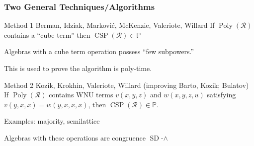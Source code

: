 \documentclass[10pt,xcolor=dvipsnames%
   ]{beamer}
\DeclareMathOperator{\SD}{SD}
\DeclareMathOperator{\CSP}{CSP}
\DeclareMathOperator{\Poly}{Poly}
\renewcommand{\.}{\cdot}
\newcommand{\sR}{\ensuremath{\mathcal{R}}}
\newcommand{\NP}{\ensuremath{\mathbb{NP}}\xspace}
\renewcommand{\P}{\ensuremath{\mathbb{P}}\xspace}
\begin{document}

\begin{frame}
\frametitle{Two General Techniques/Algorithms}
\begin{exampleblock}{Method 1 {\small Berman, Idziak, Markovi{\'c},
      McKenzie, Valeriote, Willard}}
If $\Poly(\sR)$ contains a ``cube term'' then $\CSP(\sR)\in \P$
\end{exampleblock}



Algebras with a cube term operation possess ``few subpowers.''

This is used to prove the algorithm is poly-time.



\pause

\begin{exampleblock}{Method 2 {\small Kozik, Krokhin, Valeriote, Willard (improving
    Barto, Kozik; Bulatov)}}
  If $\Poly(\sR)$ contains WNU terms $v(x,y,z)$ and $w(x,y,z,u)$
  satisfying $v(y,x,x)= w(y,x,x,x)$, then $\CSP(\sR)\in \P$.
\end{exampleblock}


Examples: majority, semilattice 

Algebras with these operations are congruence $\SD$-$\wedge$

\end{frame}
\end{document}

